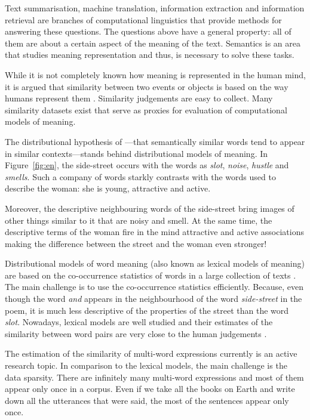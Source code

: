 Text summarisation, machine translation, information extraction and information retrieval are branches of computational linguistics that provide methods for answering these questions. The questions above have a general property: all of them are about a certain aspect of the meaning of the text. Semantics is an area that studies meaning representation and thus, is necessary to solve these tasks.

While it is not completely known how meaning is represented in the human mind, it is argued that similarity between two events or objects is based on the way humans represent them \cite{WCS:WCS1282}. Similarity judgements are easy to collect. Many similarity datasets exist that serve as proxies for evaluation of computational models of meaning.

The distributional hypothesis of \citet{harris1954distributional}---that semantically similar words tend to appear in similar contexts---stands behind distributional models of meaning. In Figure~\ref{fig:en}, the side-street occurs with the words as \textit{slot}, \textit{noise}, \textit{hustle} and \textit{smells}. Such a company of words starkly contrasts with the words used to describe the woman: she is young, attractive and active.

Moreover, the descriptive neighbouring words of the side-street bring images of other things similar to it that are noisy and smell. At the same time, the descriptive terms of the woman fire in the mind attractive and active associations making the difference between the street and the woman even stronger!

Distributional models of word meaning (also known as lexical models of meaning) are based on the co-occurrence statistics of words in a large collection of texts \cite{Turney:2010:FMV:1861751.1861756,mikolov2013linguistic,mikolov2013distributed,mikolov2013efficient}. The main challenge is to use the co-occurrence statistics efficiently. Because, even though the word \textit{and} appears in the neighbourhood of the word \textit{side-street} in the poem, it is much less descriptive of the properties of the street than the word \textit{slot}. Nowadays, lexical models are well studied and their estimates of the similarity between word pairs are very close to the human judgements \cite{TACL570,baroni-dinu-kruszewski:2014:P14-1,Halawi:2012:LLW:2339530.2339751}.

The estimation of the similarity of multi-word expressions currently is an active research topic. In comparison to the lexical models, the main challenge is the data sparsity. There are infinitely many multi-word expressions and most of them appear only once in a corpus. Even if we take all the books on Earth and write down all the utterances that were said, the most of the sentences appear only once.

